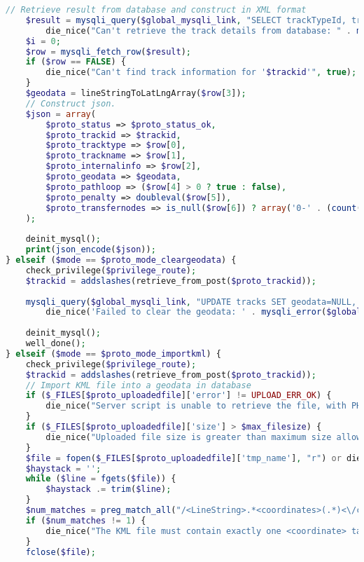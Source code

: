 \documentclass[a4paper,twoside]{article}
\begin{document}
\begin{lstlisting}[language=PHP,basicstyle=\tiny,caption=handle.php,label={lst:handle.php}]
	// Retrieve result from database and construct in XML format
	$result = mysqli_query($global_mysqli_link, "SELECT trackTypeId, trackName, internalInfo, AsText(geodata), pathloop, penalty, transferNodes FROM tracks WHERE trackId='$trackid'") or
		die_nice("Can't retrieve the track details from database: " . mysqli_error($global_mysqli_link), true);
	$i = 0;
	$row = mysqli_fetch_row($result);
	if ($row == FALSE) {
		die_nice("Can't find track information for '$trackid'", true);
	}
	$geodata = lineStringToLatLngArray($row[3]);
	// Construct json.
	$json = array(
		$proto_status => $proto_status_ok,
		$proto_trackid => $trackid,
		$proto_tracktype => $row[0],
		$proto_trackname => $row[1],
		$proto_internalinfo => $row[2],
		$proto_geodata => $geodata,
		$proto_pathloop => ($row[4] > 0 ? true : false),
		$proto_penalty => doubleval($row[5]),
		$proto_transfernodes => is_null($row[6]) ? array('0-' . (count($geodata) - 1)) : split(',', $row[6]), 
	);
	
	deinit_mysql();
	print(json_encode($json));
} elseif ($mode == $proto_mode_cleargeodata) {
	check_privilege($privilege_route);
	$trackid = addslashes(retrieve_from_post($proto_trackid));
	
	mysqli_query($global_mysqli_link, "UPDATE tracks SET geodata=NULL, transferNodes=NULL WHERE trackId='$trackid'") or
		die_nice('Failed to clear the geodata: ' . mysqli_error($global_mysqli_link), true);
	
	deinit_mysql();
	well_done();
} elseif ($mode == $proto_mode_importkml) {
	check_privilege($privilege_route);
	$trackid = addslashes(retrieve_from_post($proto_trackid));
	// Import KML file into a geodata in database
	if ($_FILES[$proto_uploadedfile]['error'] != UPLOAD_ERR_OK) {
		die_nice("Server script is unable to retrieve the file, with PHP's UPLOAD_ERR_xxx code: " . $_FILES[$proto_uploadedfile]['error'], true);
	}
	if ($_FILES[$proto_uploadedfile]['size'] > $max_filesize) {
		die_nice("Uploaded file size is greater than maximum size allowed ($max_filesize)", true);
	}
	$file = fopen($_FILES[$proto_uploadedfile]['tmp_name'], "r") or die_nice('Unable to open uploaded file', true);
	$haystack = '';
	while ($line = fgets($file)) {
		$haystack .= trim($line);
	}
	$num_matches = preg_match_all("/<LineString>.*<coordinates>(.*)<\/coordinates>.*<\/LineString>/i", $haystack, $matches, PREG_PATTERN_ORDER);
	if ($num_matches != 1) {
		die_nice("The KML file must contain exactly one <coordinate> tag inside one <LineString> tag. But I found $num_matches occurences", true);
	}
	fclose($file);
	

\end{lstlisting}
\end{document}
